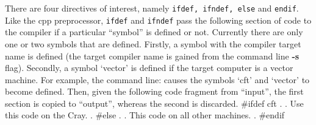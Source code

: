 There are four directives of interest, namely {\tt ifdef, ifndef,
else} and {\tt endif}. Like the cpp preprocessor, {\tt ifdef} and
{\tt ifndef} pass the following section of code to the compiler if
a particular ``symbol'' is defined or not.  Currently there are only
one or two symbols that are defined. Firstly, a symbol with the
compiler target name is defined (the target compiler name is gained
from the command line {\bf -s} flag). Secondly, a symbol `vector' is
defined if the target computer is a vector machine. For example,
 the command line:
{\ninepoint\begintt
\endtt}
causes the symbols `cft' and `vector' to become defined.  Then, given
the following code fragment from ``input'', the first section is
copied to ``output'', whereas the second is discarded.
{\ninepoint\begintt
     #ifdef cft
        .
        .  Use this code on the Cray.
        .
     #else
        .
        .  This code on all other machines.
        .
     #endif
\endtt}
